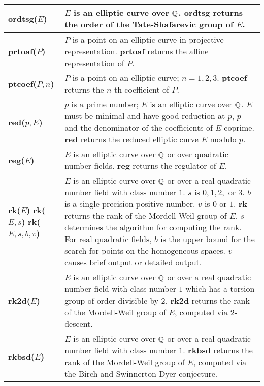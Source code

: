 {\begin{tabular}{|p{1.95in}|p{3.83in}|}
{\bf ordtsg($E$)} &
$E$ is an elliptic curve over $\mbox{$\mathbb Q$}$.\newline
{\bf ordtsg} returns the order of the Tate-Shafarevic group of $E$.\\ \hline

{\bf prtoaf($P$)} &
$P$ is a point on an elliptic curve in projective 
re\-pre\-sen\-ta\-tion.\newline
{\bf prtoaf} returns the affine representation of $P$.\\ \hline

{\bf ptcoef($P,n$)} &
$P$ is a point on an elliptic curve; $n = 1, 2, 3$.\newline
{\bf ptcoef} returns the $n$-th coefficient of $P$.\\ \hline

{\bf red($p,E$)} &
$p$ is a prime number; $E$ is an elliptic curve over $\mbox{$\mathbb Q$}$. $E$ must be minimal
and have good reduction at $p$, $p$ and the denominator of the coefficients of
$E$ coprime.\newline
{\bf red} returns the reduced elliptic curve $E$ modulo $p$.\\ \hline

{\bf reg($E$)} &
$E$ is an elliptic curve over $\mbox{$\mathbb Q$}$ or over 
quadratic number fields.\newline
{\bf reg} returns the regulator of $E$.\\ \hline

{\bf rk($E$)}\newline
{\bf rk($E,s$)}\newline
{\bf rk($E, s, b, v$)} &
$E$ is an elliptic curve over $\mbox{$\mathbb Q$}$ or over a real quadratic 
number field with class number $1$. $s$ is $0,1,2,$ or $3$. $b$ is 
a single precision positive number. $v$ is $0$ or $1$.\newline
{\bf rk} returns the rank of the Mordell-Weil group of $E$. $s$ 
determines the algorithm for computing the rank. For real quadratic
fields, $b$ is the upper bound for the search for points on the
homogeneous spaces. $v$ causes brief output or detailed output. \\ \hline

{\bf rk2d($E$)} &
$E$ is an elliptic curve over $\mbox{$\mathbb Q$}$ or over a real quadratic number field 
with class number $1$ which 
has a torsion group of order divisible by $2$.\newline
{\bf rk2d} returns the rank of the Mordell-Weil group of $E$, 
computed via 2-descent.\\ \hline

{\bf rkbsd($E$)} &
$E$ is an elliptic curve over $\mbox{$\mathbb Q$}$ or over a real quadratic number
field with class number $1$.\newline
{\bf rkbsd} returns the rank of the Mordell-Weil group of $E$, 
computed via the Birch and Swinnerton-Dyer conjecture.\\ \hline


\end{tabular}}
